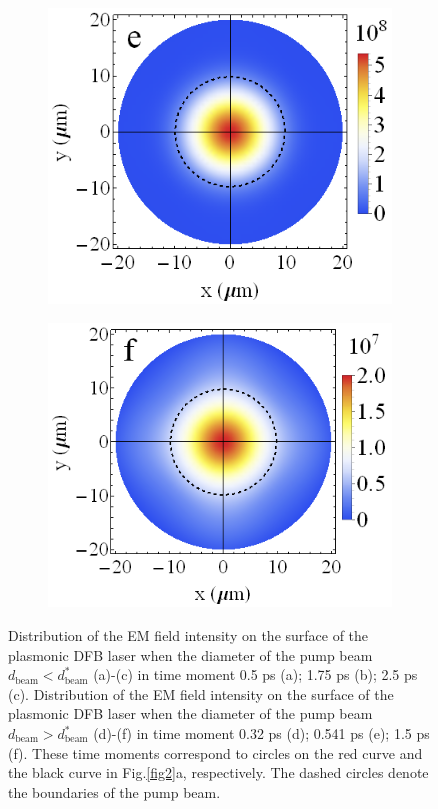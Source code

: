 \documentclass[aps,prapplied,amsmath,amssymb,onecolumn,superscriptaddress,showpacs,floatfix,longbibliography]{revtex4-1}
\begin{document}
\begin{figure}[h]
\begin{subfigure}[h]{0.32\linewidth}
		\includegraphics[width=\linewidth]{Fig3e.png}
	\end{subfigure}
	\begin{subfigure}[h]{0.32\linewidth}
		\includegraphics[width=\linewidth]{Fig3f.png}
	\end{subfigure}
	\caption{Distribution of the EM field intensity on the surface of the plasmonic DFB laser when the diameter of the pump beam $d_{\text{beam}}<d_{\text{beam}}^*$ (a)-(c) in time moment 0.5 ps (a); 1.75 ps (b); 2.5 ps (c). Distribution of the EM field intensity on the surface of the plasmonic DFB laser when the diameter of the pump beam $d_{\text{beam}}>d_{\text{beam}}^*$ (d)-(f) in time moment 0.32 ps (d); 0.541 ps (e); 1.5 ps (f). These time moments correspond to circles on the red curve and the black curve in Fig.\ref{fig2}a, respectively. The dashed circles denote the boundaries of the pump beam.}
	\label{fig3}	
\end{figure}
\end{document}
